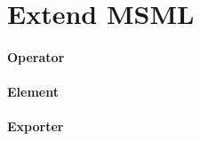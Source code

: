 \section{Extend MSML}
\label{sec:extend}

\paragraph{Operator}
\label{sec:operator}

\paragraph{Element}
\label{sec:element}

\paragraph{Exporter}
\label{sec:exporter}


